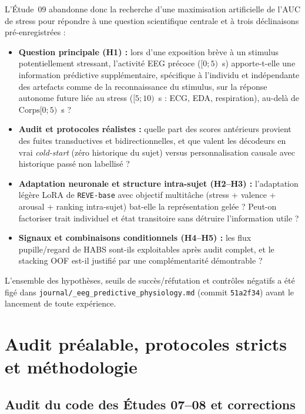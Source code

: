 \documentclass[10pt]{article}
\begin{document}
L'Étude~09 abandonne donc la recherche d'une maximisation artificielle de l'AUC de stress pour répondre à une question scientifique centrale et à trois déclinaisons pré-enregistrées :
\begin{itemize}
\item \textbf{Question principale (H1) :} lors d'une exposition brève à un stimulus potentiellement stressant, l'activité EEG précoce ($[0 ; 5)$~s) apporte-t-elle une information prédictive supplémentaire, spécifique à l'individu et indépendante des artefacts comme de la reconnaissance du stimulus, sur la réponse autonome future liée au stress ($[5 ; 10)$~s : ECG, EDA, respiration), au-delà de $\text{Corps}[0 ; 5)$~s ?
\item \textbf{Audit et protocoles réalistes :} quelle part des scores antérieurs provient des fuites transductives et bidirectionnelles, et que valent les décodeurs en vrai \emph{cold-start} (zéro historique du sujet) versus personnalisation causale avec historique passé non labellisé ?
\item \textbf{Adaptation neuronale et structure intra-sujet (H2--H3) :} l'adaptation légère LoRA de \texttt{REVE-base} avec objectif multitâche (stress + valence + arousal + ranking intra-sujet) bat-elle la représentation gelée ? Peut-on factoriser trait individuel et état transitoire sans détruire l'information utile ?
\item \textbf{Signaux et combinaisons conditionnels (H4--H5) :} les flux pupille/regard de HABS sont-ils exploitables après audit complet, et le stacking OOF est-il justifié par une complémentarité démontrable ?
\end{itemize}

L'ensemble des hypothèses, seuils de succès/réfutation et contrôles négatifs a été figé dans \texttt{journal/\_eeg\_\allowbreak predictive\_\allowbreak physiology.md} (commit \texttt{51a2f34}) avant le lancement de toute expérience.

\section{Audit préalable, protocoles stricts et méthodologie}

\subsection{Audit du code des Études 07--08 et corrections}
\end{document}
